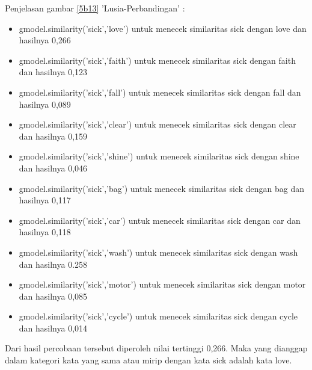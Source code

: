 \begin{enumerate}
\begin{enumerate}
			\par Penjelasan gambar \ref{5b13} 'Lusia-Perbandingan' : 
			\begin{itemize}
				\item gmodel.similarity('sick','love') untuk menecek similaritas sick dengan love dan hasilnya 0,266
				\item gmodel.similarity('sick','faith') untuk menecek similaritas sick dengan faith dan hasilnya 0,123
				\item gmodel.similarity('sick','fall') untuk menecek similaritas sick dengan fall dan hasilnya 0,089
				\item gmodel.similarity('sick','clear') untuk menecek similaritas sick dengan clear dan hasilnya 0,159
				\item gmodel.similarity('sick','shine') untuk menecek similaritas sick dengan shine dan hasilnya 0,046
				\item gmodel.similarity('sick','bag') untuk menecek similaritas sick dengan bag dan hasilnya 0,117
				\item gmodel.similarity('sick','car') untuk menecek similaritas sick dengan car dan hasilnya 0,118
				\item gmodel.similarity('sick','wash') untuk menecek similaritas sick dengan wash dan hasilnya 0.258
				\item gmodel.similarity('sick','motor') untuk menecek similaritas sick dengan motor dan hasilnya 0,085
				\item gmodel.similarity('sick','cycle') untuk menecek similaritas sick dengan cycle dan hasilnya 0,014
			\end{itemize}
			
			\par Dari hasil percobaan tersebut diperoleh nilai tertinggi 0,266. Maka yang dianggap dalam kategori kata yang sama atau mirip dengan kata sick adalah kata love.
	\end{enumerate}


\end{enumerate}
